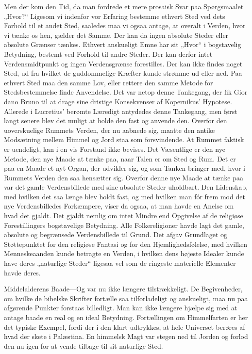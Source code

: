 \documentclass[12pt,a4paper]{article}
\newcommand{\opage}[1]{\marginnote{\footnotesize\textit{[#1]}}}
\begin{document}
Men der kom den Tid, da man fordrede et mere prosaisk Svar paa
Spørgsmaalet „Hvor?“ Ligesom vi indenfor vor Erfaring bestemme ethvert
Sted ved dets Forhold til et andet Sted, saaledes maa vi ogsaa antage, at
overalt i Verden, hvor vi tænke os hen, gælder det Samme. Der kan da ingen
absolute Steder eller absolute Grænser tænkes. Ethvert anskueligt Emne har
sit „Hvor“ i bogstavelig Betydning, bestemt ved Forhold til andre Steder.
Der kan derfor intet Verdensmidtpunkt og ingen Verdensgrænse forestilles.
Der kan ikke findes noget Sted, ud fra hvilket de guddommelige Kræfter
kunde strømme ud eller ned. Paa ethvert Sted maa den samme Lov, eller
rettere den samme Metode for Stedsbestemmelse finde Anvendelse. Det var
netop denne Tankegang, der fik Gior%
\opage{8}dano Bruno til at drage sine dristige
Konsekvenser af Kopernikus' Hypotese. Allerede i Lucretius' berømte
Læredigt antydedes denne Tankegang, men først langt senere blev det muligt
at holde den fast og anvende den. Overfor den uoverskuelige Rummets
Verden, der nu aabnede sig, maatte den antike Modsætning mellem Himmel og
Jord staa som forsvindende. At Rummet faktisk er uendeligt, kan i en vis
Forstand ikke bevises. Det Væsentlige er den nye Metode, den nye Maade at
tænke paa, naar Talen er om Sted og Rum. Det er paa en Maade et nyt Organ,
der udvikler sig, og som Tanken bringer med, hvor i Rummets Verden den saa
hensætter sig. Overfor denne nye Maade at tænke paa var det gamle
Verdensbillede med sine absolute Steder uholdbart. Den Lidenskab, med
hvilken det saa længe blev holdt fast, og med hvilken man fór frem mod det
nye Verdensbilledes Forkæmpere, viser da ogsaa, at man havde en Anelse om
hvad det gjaldt. Det gjaldt nemlig om intet Mindre end Opgivelse af de
religiøse Forestillingers bogstavelige Betydning. Alle Folkereligioner
havde lagt det gamle, absolute og begrænsede Verdensbillede til Grund. Det
afgav Grundlaget og Støttepunktet for den religiøse Fantasi og for den
Hjemlighedsfølelse, med hvilken Menneskeaanden kunde betragte en Verden, i
hvilken dens højeste Idealer kunde have deres „naturlige Steder“ ligesaa
vel som de ringeste materielle Elementer havde deres.

Middelalderens Baade---Og var nu ikke længere tilstrækkeligt. De
Begivenheder, om hvilke de bibelske Skrifter fortælle saa tilforladeligt
og anskueligt, maa nu paa afgørende Punkter forstaas billedligt. Man kan
ikke længere hjælpe sig med at antage baade en real og en ideal Betydning.
Fortællingen om Himmelfarten er her det typiske Exempel, fordi der i den
klart udtrykkes, at hele Universet berøres af hvad der skete i Palæstina. \opage{9}
En himmelsk Magt var stegen ned til Jorden og forlod den nu igen for at
vende tilbage til sit naturlige Sted.
\end{document}
